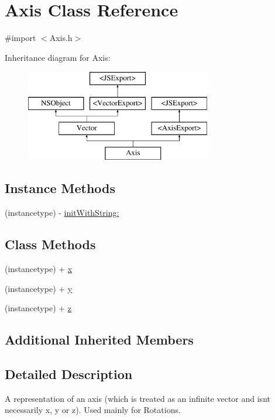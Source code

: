 \hypertarget{interface_axis}{}\section{Axis Class Reference}
\label{interface_axis}


{\ttfamily \#import $<$Axis.\+h$>$}

Inheritance diagram for Axis\+:\begin{figure}[H]
\begin{center}
\leavevmode
\includegraphics[height=4.000000cm]{interface_axis}
\end{center}
\end{figure}
\subsection*{Instance Methods}
\begin{DoxyCompactItemize}
\item 
(instancetype) -\/ \hyperlink{interface_axis_a9e8012b597263e5e31968621e8bd3a34}{init\+With\+String\+:}
\end{DoxyCompactItemize}
\subsection*{Class Methods}
\begin{DoxyCompactItemize}
\item 
(instancetype) + \hyperlink{interface_axis_a08184f5bbd3c5c2ad4a33738bad9c588}{x}
\item 
(instancetype) + \hyperlink{interface_axis_a928bf5dc88832e59ca6c2977cf7e5aea}{y}
\item 
(instancetype) + \hyperlink{interface_axis_ad9f7e80cf77c62c743b4b81379b5870d}{z}
\end{DoxyCompactItemize}
\subsection*{Additional Inherited Members}


\subsection{Detailed Description}
A representation of an axis (which is treated as an infinite vector and isn\textquotesingle{}t necessarily x, y or z). Used mainly for Rotations. 

